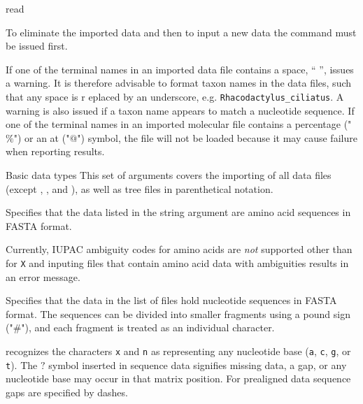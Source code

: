 \begin{command}{read}{}
\begin{arguments}
\begin{statement}
\setlength{\parindent}{0.5cm}                
\indent To eliminate the imported data and then to input a new data
the  command must be issued first. 
\end{statement}

\begin{statement}
If one of the terminal names in an imported data file contains
a space, `` '', \poy issues a warning. It is therefore advisable to 
format taxon  names in the data files, such that any space is r
eplaced by an underscore, e.g. \texttt{Rhacodactylus\_ciliatus}. 
A warning is also issued if a taxon name appears to match a 
nucleotide sequence. If one of the terminal names in an imported 
molecular file contains a percentage ("$\%$") or an at ("$@$") 
symbol, the file will not be loaded because it may cause failure
 when reporting results.

\end{statement}

\begin{argumentgroup}{Basic data types}
This set of arguments covers the importing of all data files (except 
, , 
 and ),
as well as tree files in parenthetical notation.

{Specifies that the data listed in the string argument
are amino acid sequences in FASTA format.} {}

\begin{statement}
Currently, IUPAC ambiguity codes for amino acids are \emph{not}
supported other than for \texttt{X} and inputing files that contain amino 
acid data with ambiguities results in an error message.
\end{statement}

{Specifies that the data in the list of files hold nucleotide
sequences in FASTA format. The sequences can be divided into smaller
fragments using a pound sign ("\#"), and each fragment is treated as an
individual character.} 
{}

\begin{statement}
\poy recognizes the characters \texttt{x} and \texttt{n} as
representing any nucleotide base (\texttt{a}, \texttt{c}, \texttt{g}, 
or \texttt{t}). The \texttt{$?$} symbol inserted in sequence data 
signifies missing data, a gap, or any nucleotide base may occur in 
that matrix position. For prealigned data sequence gaps are 
specified by dashes.
\end{statement}


\end{argumentgroup}
\end{arguments}
\end{command}
